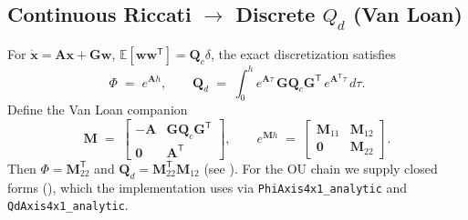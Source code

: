 \documentclass[11pt]{article}
\newcommand{\vect}[1]{\bm{#1}}
\newcommand{\mat}[1]{\bm{#1}}
\newcommand{\E}{\mathbb{E}}
\newcommand{\T}{\mathsf{T}}
\begin{document}
\subsection{Continuous Riccati \texorpdfstring{$\to$}{} Discrete \texorpdfstring{$Q_d$}{} (Van Loan)}
\label{sec:vanloan}
For \(\dot{\vect{x}}=\mat{A}\vect{x}+\mat{G}\vect{w}\), \(\E[\vect{w}\vect{w}^{\T}]=\mat{Q}_c\delta\),
the exact discretization satisfies
\begin{equation}
  \Phi \;=\; e^{\mat{A}h}, \qquad
  \mat{Q}_d \;=\; \int_0^h e^{\mat{A}\tau}\,\mat{G}\mat{Q}_c \mat{G}^{\T}\, e^{\mat{A}^{\T}\tau}\, d\tau.
  \label{eq:Qd-def}
\end{equation}
Define the Van Loan companion
\begin{equation}
  \mat{M} \;=\;
  \begin{bmatrix}
    -\mat{A} & \mat{G}\mat{Q}_c\mat{G}^{\T} \\
    \mat{0}  & \mat{A}^{\T}
  \end{bmatrix},\qquad
  e^{\mat{M}h} \;=\;
  \begin{bmatrix}
    \mat{M}_{11} & \mat{M}_{12}\\
    \mat{0}      & \mat{M}_{22}
  \end{bmatrix}.
  \label{eq:van-loan}
\end{equation}
Then \( \Phi = \mat{M}_{22}^{\T} \) and \( \mat{Q}_d = \mat{M}_{22}^{\T}\mat{M}_{12} \)
(see ). For the OU chain we supply closed forms
(), which the implementation uses via
\texttt{PhiAxis4x1\_analytic} and \texttt{QdAxis4x1\_analytic}.
\end{document}
